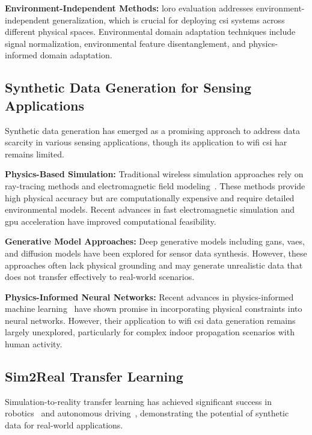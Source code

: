 \documentclass[journal]{IEEEtran}
\begin{document}
\textbf{Environment-Independent Methods:} \gls{loro} evaluation addresses environment-independent generalization, which is crucial for deploying \gls{csi} systems across different physical spaces. Environmental domain adaptation techniques include signal normalization, environmental feature disentanglement, and physics-informed domain adaptation.

\subsection{Synthetic Data Generation for Sensing Applications}

Synthetic data generation has emerged as a promising approach to address data scarcity in various sensing applications, though its application to \gls{wifi} \gls{csi} \gls{har} remains limited.

\textbf{Physics-Based Simulation:} Traditional wireless simulation approaches rely on ray-tracing methods and electromagnetic field modeling~\cite{ray_tracing_wireless2000}. These methods provide high physical accuracy but are computationally expensive and require detailed environmental models. Recent advances in fast electromagnetic simulation and \gls{gpu} acceleration have improved computational feasibility.

\textbf{Generative Model Approaches:} Deep generative models including \glspl{gan}, \glspl{vae}, and diffusion models have been explored for sensor data synthesis. However, these approaches often lack physical grounding and may generate unrealistic data that does not transfer effectively to real-world scenarios.

\textbf{Physics-Informed Neural Networks:} Recent advances in physics-informed machine learning~\cite{pinn_karniadakis2021} have shown promise in incorporating physical constraints into neural networks. However, their application to \gls{wifi} \gls{csi} data generation remains largely unexplored, particularly for complex indoor propagation scenarios with human activity.

\subsection{Sim2Real Transfer Learning}

Simulation-to-reality transfer learning has achieved significant success in robotics~\cite{sim2real_robotics2017} and autonomous driving~\cite{sim2real_autonomous2019}, demonstrating the potential of synthetic data for real-world applications.
\end{document}
